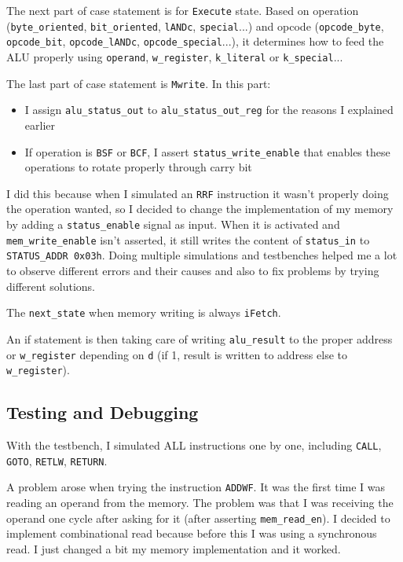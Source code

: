 The next part of case statement is for \texttt{Execute} state. Based on operation (\texttt{byte\_oriented}, \texttt{bit\_oriented}, \texttt{lANDc}, \texttt{special}...) and opcode (\texttt{opcode\_byte}, \texttt{opcode\_bit}, \texttt{opcode\_lANDc}, \texttt{opcode\_special}...), it determines how to feed the ALU properly using \texttt{operand}, \texttt{w\_register}, \texttt{k\_literal} or \texttt{k\_special}...

The last part of case statement is \texttt{Mwrite}. In this part:
\begin{itemize}
    \item I assign \texttt{alu\_status\_out} to \texttt{alu\_status\_out\_reg} for the reasons I explained earlier
    \item If operation is \texttt{BSF} or \texttt{BCF}, I assert \texttt{status\_write\_enable} that enables these operations to rotate properly through carry bit
\end{itemize}

I did this because when I simulated an \texttt{RRF} instruction it wasn't properly doing the operation wanted, so I decided to change the implementation of my memory by adding a \texttt{status\_enable} signal as input. When it is activated and \texttt{mem\_write\_enable} isn't asserted, it still writes the content of \texttt{status\_in} to \texttt{STATUS\_ADDR 0x03h}. Doing multiple simulations and testbenches helped me a lot to observe different errors and their causes and also to fix problems by trying different solutions.

The \texttt{next\_state} when memory writing is always \texttt{iFetch}.

An if statement is then taking care of writing \texttt{alu\_result} to the proper address or \texttt{w\_register} depending on \texttt{d} (if 1, result is written to address else to \texttt{w\_register}).

\subsection{Testing and Debugging}
With the testbench, I simulated ALL instructions one by one, including \texttt{CALL}, \texttt{GOTO}, \texttt{RETLW}, \texttt{RETURN}.

A problem arose when trying the instruction \texttt{ADDWF}. It was the first time I was reading an operand from the memory. The problem was that I was receiving the operand one cycle after asking for it (after asserting \texttt{mem\_read\_en}). I decided to implement combinational read because before this I was using a synchronous read. I just changed a bit my memory implementation and it worked.

